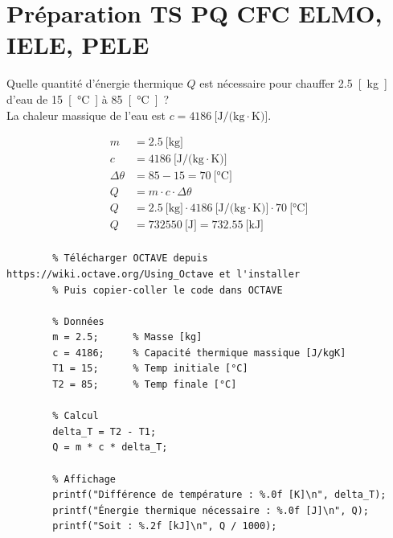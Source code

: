 \documentclass[a4paper,11pt,answers,addpoints]{exam}
\begin{document}
	
	
	\unframedsolutions
	\pointsinmargin
	\bracketedpoints
	\section*{Préparation TS PQ CFC ELMO, IELE, PELE}
	\begin{questions}

\question[6] Quelle quantité d'énergie thermique $Q$ est nécessaire pour chauffer \qty{2,5}{[\kilo\gram]} d'eau de \qty{15}{[\celsius]} à \qty{85}{[\celsius]}~?\\
La chaleur massique de l'eau est $c = \qty{4186}{[\joule/(\kilo\gram\cdot\kelvin)]}$.

\begin{solution}
	\begin{align*}
		m &= \qty{2,5}{[\kilo\gram]} \\[6pt]
		c &= \qty{4186}{[\joule/(\kilo\gram\cdot\kelvin)]} \\[6pt]
		\Delta \theta &= 85 - 15 = \qty{70}{[\celsius]} \\[6pt]
		Q &= m \cdot c \cdot \Delta \theta \\[6pt]
		Q &= \qty{2,5}{[\kilo\gram]} \cdot \qty{4186}{[\joule/(\kilo\gram\cdot\kelvin)]} \cdot \qty{70}{[\celsius]} \\[6pt]
		Q &= \qty{732550}{[\joule]} = \qty{732,55}{[\kilo\joule]} \\[6pt]
	\end{align*}
	
	\begin{verbatim}
		% Télécharger OCTAVE depuis https://wiki.octave.org/Using_Octave et l'installer
		% Puis copier-coller le code dans OCTAVE
		
		% Données
		m = 2.5;      % Masse [kg]
		c = 4186;     % Capacité thermique massique [J/kgK]
		T1 = 15;      % Temp initiale [°C]
		T2 = 85;      % Temp finale [°C]
		
		% Calcul
		delta_T = T2 - T1;
		Q = m * c * delta_T;
		
		% Affichage
		printf("Différence de température : %.0f [K]\n", delta_T);
		printf("Énergie thermique nécessaire : %.0f [J]\n", Q);
		printf("Soit : %.2f [kJ]\n", Q / 1000);
	\end{verbatim}
\end{solution}
\end{questions}
\end{document}
